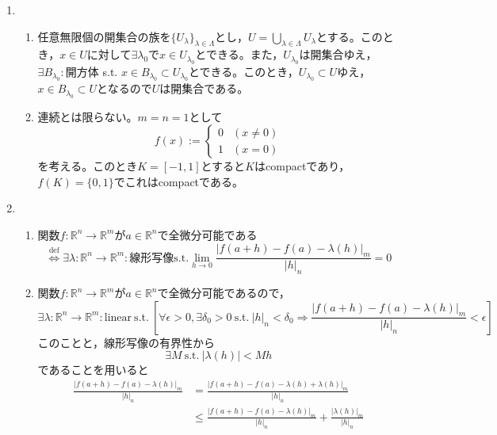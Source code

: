 \documentclass[dvipdfmx,a4j,10pt]{jsarticle}
\theoremstyle{mystyle1}
\theoremstyle{mystyle2}
\begin{document}
\begin{enumerate}
    \item
        \begin{enumerate}\renewcommand{\labelenumii}{(\arabic{enumii})}
            \item 任意無限個の開集合の族を$\{U_\lambda\}_{\lambda\in\Lambda}$とし，$\displaystyle U=\bigcup_{\lambda\in\Lambda}U_\lambda$とする。このとき，$x\in U$に対して$\exists\lambda_0$で$x\in U_{\lambda_0}$とできる。また，$U_{\lambda_0}$は開集合ゆえ，$\exists B_{\lambda_0}:$開方体 s.t. $x\in B_{\lambda_0}\subset U_{\lambda_0}$とできる。このとき，$U_{\lambda_0}\subset U$ゆえ，$x\in B_{\lambda_0}\subset U$となるので$U$は開集合である。
            \item 連続とは限らない。$m=n=1$として
            \[
            f(x):=
            \begin{cases}
                0 & (x\neq0)\\
                1 & (x=0)
            \end{cases}
            \]
            を考える。このとき$K=[-1,1]$とすると$K$はcompactであり，$f(K)=\{0,1\}$でこれはcompactである。
        \end{enumerate}
    \item
        \begin{enumerate}\renewcommand{\labelenumii}{(\arabic{enumii})}
            \item 関数$f:\mathbb{R}^n\to\mathbb{R}^m$が$a\in\mathbb{R}^n$で全微分可能である
            \[
                \overset{\textrm{def}}{\Leftrightarrow}\exists\lambda:\mathbb{R}^n\to\mathbb{R}^m:線形写像 \textrm{s.t.} \lim_{h\to0}\frac{|f(a+h)-f(a)-\lambda(h)|_m}{|h|_n}=0
            \]
            \item 関数$f:\mathbb{R}^n\to\mathbb{R}^m$が$a\in\mathbb{R}^n$で全微分可能であるので，
            \[
            \exists\lambda:\mathbb{R}^n\to\mathbb{R}^m:\textrm{linear}\ \textrm{s.t.}\ \left[\forall\epsilon>0,\exists\delta_0>0\ \textrm{s.t.}\ |h|_n<\delta_0 \Rightarrow \frac{|f(a+h)-f(a)-\lambda(h)|_m}{|h|_n}<\epsilon\right]
            \]
            このことと，線形写像の有界性から
            \[
            \exists M\ \textrm{s.t.}\ |\lambda(h)|<Mh
            \]
            であることを用いると
            \[
            \begin{split}
            \frac{|f(a+h)-f(a)-\lambda(h)|_m}{|h|_n}
            &=\frac{|f(a+h)-f(a)-\lambda(h)+\lambda(h)|_m}{|h|_n}\\
            &\leq\frac{|f(a+h)-f(a)-\lambda(h)|_m}{|h|_n}+\frac{|\lambda(h)|_m}{|h|_n}\\

\end{split}\]
\end{enumerate}
\end{enumerate}
\end{document}
